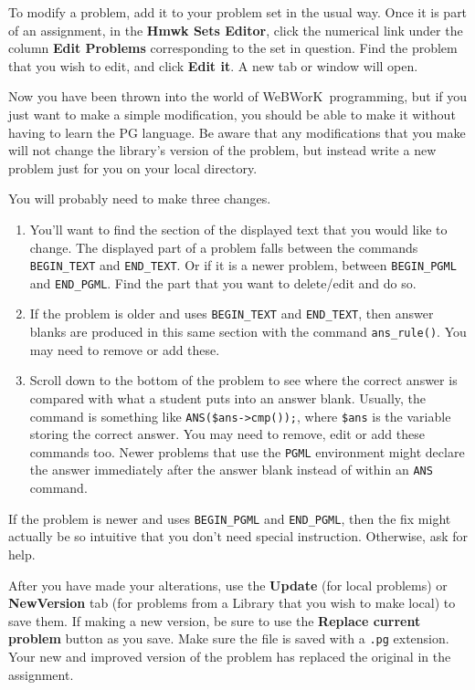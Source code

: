 \documentclass[12pt]{article}
\newcommand{\menu}[1]{\textbf{#1}}
\newcommand{\WW}{WeBWorK}
\newcommand{\HSE}{\menu{Hmwk Sets Editor}}
\begin{document}
To modify a problem, add it to your problem set in the usual way.
Once it is part of an assignment, in the \HSE, click the numerical link under the column \menu{Edit Problems} corresponding to the set in question.
Find the problem that you wish to edit, and click \menu{Edit it}.
A new tab or window will open.

Now you have been thrown into the world of \WW\ programming, but if you just want to make a simple modification, you should be able to make it without having to learn the PG language.
Be aware that any modifications that you make will not change the library's version of the problem, but instead write a new problem just for you on your local directory.

You will probably need to make three changes.
\begin{enumerate}
	\item You'll want to find the section of the displayed text that you would like to change.
	      The displayed part of a problem falls between the commands \verb=BEGIN_TEXT= and \verb=END_TEXT=.
	      Or if it is a newer problem, between  \verb=BEGIN_PGML= and \verb=END_PGML=.
	      Find the part that you want to delete/edit and do so.

	\item If the problem is older and uses \verb=BEGIN_TEXT= and \verb=END_TEXT=, then answer blanks are produced in this same section with the command \verb=ans_rule()=.
	      You may need to remove or add these.

	\item Scroll down to the bottom of the problem to see where the correct answer is compared with what a student puts into an answer blank.
	      Usually, the command is something like \verb=ANS($ans->cmp());=, where \verb=$ans= is the variable storing the correct answer.
	      You may need to remove, edit or add these commands too.
	      Newer problems that use the \texttt{PGML} environment might declare the answer immediately after the answer blank instead of within an \texttt{ANS} command.
\end{enumerate}
If the problem is newer and uses \verb=BEGIN_PGML= and \verb=END_PGML=, then the fix might actually be so intuitive that you don't need special instruction.
Otherwise, ask for help.

After you have made your alterations, use the \menu{Update} (for local problems) or \menu{NewVersion} tab (for problems from a Library that you wish to make local) to save them.
If making a new version, be sure to use the \menu{Replace current problem} button as you save.
Make sure the file is saved with a \texttt{.pg} extension.
Your new and improved version of the problem has replaced the original in the assignment.
\end{document}
